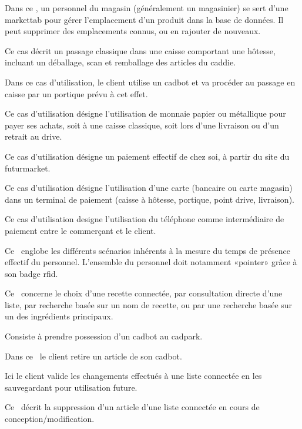 Dans ce \cu, un personnel du magasin (généralement un magasinier) se sert d'une markettab pour gérer l'emplacement d'un produit dans la base de données.
Il peut supprimer des emplacements connus, ou en rajouter de nouveaux.

Ce cas décrit un passage classique dans une caisse comportant une hôtesse, incluant un déballage, scan et remballage des articles du caddie.

Dans ce cas d'utilisation, le client utilise un cadbot et va procéder au passage en caisse par un portique prévu à cet effet. 

Ce cas d'utilisation désigne l'utilisation de monnaie papier ou métallique pour payer ses achats, soit à une caisse classique, soit lors d'une livraison ou d'un retrait au drive.

Ce cas d'utilisation désigne un paiement effectif de chez soi, à partir du site du futurmarket.

Ce cas d'utilisation désigne l'utilisation d'une carte (bancaire ou carte magasin) dans un terminal de paiement (caisse à hôtesse, portique, point drive, livraison).

Ce cas d'utilisation designe l'utilisation du téléphone comme intermédiaire de paiement entre le commerçant et le client. 

Ce \cu\ englobe les différents scénarios inhérents à la mesure du temps de présence effectif du personnel.
L'ensemble du personnel doit notamment «pointer» grâce à son badge rfid.

Ce \cu\ concerne le choix d'une recette connectée, par consultation directe d'une liste, par recherche basée sur un nom de recette, ou par une recherche basée sur un des ingrédients principaux.

Consiste à prendre possession d'un cadbot au cadpark.

Dans ce \cu\ le client retire un article de son cadbot.

Ici le client valide les changements effectués à une liste connectée en les sauvegardant pour utilisation future.

Ce \cu\ décrit la suppression d'un article d'une liste connectée en cours de conception/modification.

